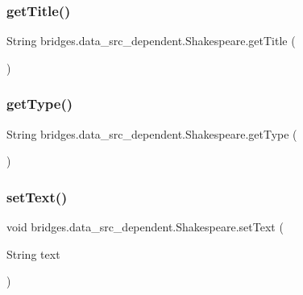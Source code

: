 \hypertarget{classbridges_1_1data__src__dependent_1_1_shakespeare_a0f045c5d1140414b7ad6ad5511e6e79c}{}\label{classbridges_1_1data__src__dependent_1_1_shakespeare_a0f045c5d1140414b7ad6ad5511e6e79c} 
\subsubsection{\texorpdfstring{get\+Title()}{getTitle()}}
{\footnotesize\ttfamily String bridges.\+data\+\_\+src\+\_\+dependent.\+Shakespeare.\+get\+Title (\begin{DoxyParamCaption}{ }\end{DoxyParamCaption})}

\hypertarget{classbridges_1_1data__src__dependent_1_1_shakespeare_adbbb48b9e2564ae910e0313dd88542fd}{}\label{classbridges_1_1data__src__dependent_1_1_shakespeare_adbbb48b9e2564ae910e0313dd88542fd} 
\subsubsection{\texorpdfstring{get\+Type()}{getType()}}
{\footnotesize\ttfamily String bridges.\+data\+\_\+src\+\_\+dependent.\+Shakespeare.\+get\+Type (\begin{DoxyParamCaption}{ }\end{DoxyParamCaption})}

\hypertarget{classbridges_1_1data__src__dependent_1_1_shakespeare_aa2ae0bee864990ae11950039636e52b1}{}\label{classbridges_1_1data__src__dependent_1_1_shakespeare_aa2ae0bee864990ae11950039636e52b1} 
\subsubsection{\texorpdfstring{set\+Text()}{setText()}}
{\footnotesize\ttfamily void bridges.\+data\+\_\+src\+\_\+dependent.\+Shakespeare.\+set\+Text (\begin{DoxyParamCaption}\item[{String}]{text }\end{DoxyParamCaption})}

